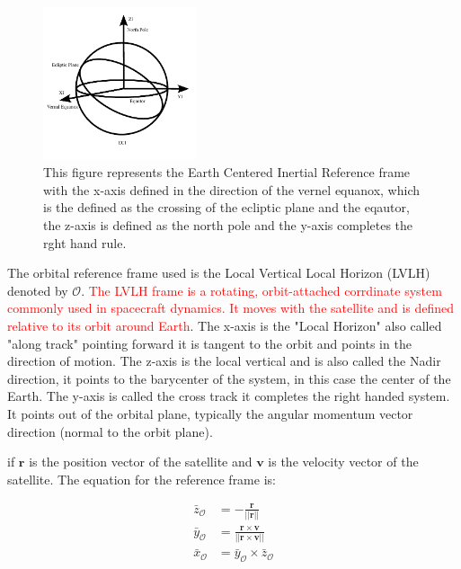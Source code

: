 \begin{figure}[H]
    \centering
    \includegraphics[width=0.4\textwidth]{figures/modelling/ECI.pdf}
    \caption{This figure represents the Earth Centered Inertial Reference frame with the x-axis defined in the direction of the vernel equanox, which is the defined as the crossing
    of the ecliptic plane and the eqautor, the z-axis is defined as the north pole and the y-axis completes the rght hand rule.}
    \label{fig:ECIRF}
\end{figure}


The orbital reference frame used is the Local Vertical Local Horizon (LVLH) denoted by $\mathcal{O}$. \textcolor{red}{The LVLH frame is a rotating, orbit-attached corrdinate
system commonly used in spacecraft dynamics. It moves with the satellite and is defined relative to its orbit around Earth}. The x-axis is the "Local Horizon" also called
"along track" pointing forward it is tangent to the orbit and points in the direction of motion. The z-axis is the local vertical and is also called the Nadir direction, it points
to the barycenter of the system, in this case the center of the Earth. The y-axis is called the cross track it completes the right handed system. It points out of the orbital plane,
typically the angular momentum vector direction (normal to the orbit plane).

if $\mathbf{r}$ is the position vector of the satellite and $\mathbf{v}$ is the velocity vector of the satellite.
The equation for the reference frame is:

\begin{align}
    \bar{z}_{\mathcal{O}} &= -\frac{\mathbf{r}}{||\mathbf{r}||} \\
    \bar{y}_{\mathcal{O}} &= \frac{\mathbf{r}\times\mathbf{v}}{||\mathbf{r}\times\mathbf{v}||}\\
    \bar{x}_{\mathcal{O}} &= \bar{y}_{\mathcal{O}}\times\bar{z}_{\mathcal{O}}
\end{align}

